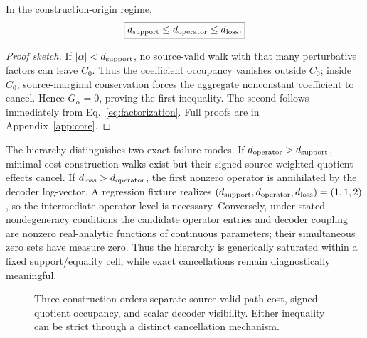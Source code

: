 \begin{theorem}
\label{thm:hierarchy}
In the construction-origin regime,
\[
\boxed{d_{\mathrm{support}}\leq d_{\mathrm{operator}}\leq d_{\mathrm{loss}}.}
\]
\end{theorem}
\begin{proof}[Proof sketch]
If $|\alpha|<d_{\mathrm{support}}$, no source-valid walk with that many perturbative factors can leave $C_0$. Thus the coefficient occupancy vanishes outside $C_0$; inside $C_0$, source-marginal conservation forces the aggregate nonconstant coefficient to cancel. Hence $G_\alpha=0$, proving the first inequality. The second follows immediately from Eq.~\eqref{eq:factorization}. Full proofs are in Appendix~\ref{app:core}.
\end{proof}

The hierarchy distinguishes two exact failure modes. If $d_{\mathrm{operator}}>d_{\mathrm{support}}$, minimal-cost construction walks exist but their signed source-weighted quotient effects cancel. If $d_{\mathrm{loss}}>d_{\mathrm{operator}}$, the first nonzero operator is annihilated by the decoder log-vector. A regression fixture realizes $(d_{\mathrm{support}},d_{\mathrm{operator}},d_{\mathrm{loss}})=(1,1,2)$, so the intermediate operator level is necessary. Conversely, under stated nondegeneracy conditions the candidate operator entries and decoder coupling are nonzero real-analytic functions of continuous parameters; their simultaneous zero sets have measure zero. Thus the hierarchy is generically saturated within a fixed support/equality cell, while exact cancellations remain diagnostically meaningful.

\begin{figure}[t]
\centering
{}
\caption{Three construction orders separate source-valid path cost, signed quotient occupancy, and scalar decoder visibility. Either inequality can be strict through a distinct cancellation mechanism.}
\label{fig:hierarchy}
\end{figure}
